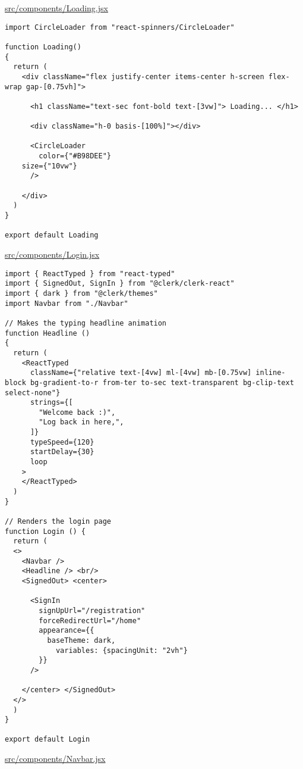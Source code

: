 \underline{src/components/Loading.jsx}

\begin{verbatim}
import CircleLoader from "react-spinners/CircleLoader"

function Loading()
{
  return (
    <div className="flex justify-center items-center h-screen flex-wrap gap-[0.75vh]">

      <h1 className="text-sec font-bold text-[3vw]"> Loading... </h1>

      <div className="h-0 basis-[100%]"></div>

      <CircleLoader
        color={"#B98DEE"}
	size={"10vw"}
      />

    </div>
  )
}

export default Loading
\end{verbatim}

\underline{src/components/Login.jsx}

\begin{verbatim}
import { ReactTyped } from "react-typed"
import { SignedOut, SignIn } from "@clerk/clerk-react"
import { dark } from "@clerk/themes"
import Navbar from "./Navbar"

// Makes the typing headline animation
function Headline ()
{
  return (
    <ReactTyped
      className={"relative text-[4vw] ml-[4vw] mb-[0.75vw] inline-block bg-gradient-to-r from-ter to-sec text-transparent bg-clip-text select-none"}
      strings={[
        "Welcome back :)",
        "Log back in here,",
      ]}
      typeSpeed={120}
      startDelay={30}
      loop
    >
    </ReactTyped>
  )
}

// Renders the login page
function Login () {
  return (
  <>
    <Navbar />
    <Headline /> <br/>
    <SignedOut> <center>

      <SignIn
        signUpUrl="/registration"
        forceRedirectUrl="/home"
        appearance={{
          baseTheme: dark,
            variables: {spacingUnit: "2vh"}
        }}
      />

    </center> </SignedOut>
  </>
  )
}

export default Login
\end{verbatim}

\underline{src/components/Navbar.jsx}

